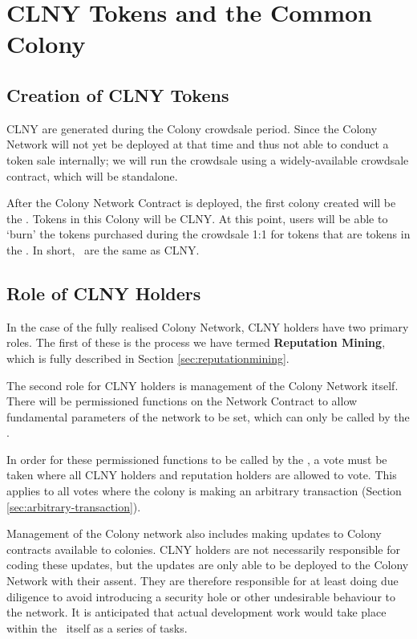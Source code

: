 \section{CLNY Tokens and the Common Colony}\label{sec:clny}

\subsection{Creation of CLNY Tokens}
CLNY are generated during the Colony crowdsale period. Since the Colony Network will not yet be deployed at that time and thus not able to conduct a token sale internally; we will run the crowdsale using a widely-available crowdsale contract, which will be standalone.

After the Colony Network Contract is deployed, the first colony created will be the \rc. Tokens in this Colony will be CLNY. At this point, users will be able to `burn' the tokens purchased during the crowdsale 1:1 for tokens that are tokens in the \rc. In short, \rcts\ are the same as CLNY.

\subsection{Role of CLNY Holders}
In the case of the fully realised Colony Network, CLNY holders have two primary roles. The first of these is the process we have termed \textbf{Reputation Mining}, which is fully described in Section \ref{sec:reputationmining}.

The second role for CLNY holders is management of the Colony Network itself. There will be permissioned functions on the Network Contract to allow fundamental parameters of the network to be set, which can only be called by the \rc.

In order for these permissioned functions to be called by the \rc, a vote must be taken where all CLNY holders and reputation holders are allowed to vote. This applies to all votes where the colony is making an arbitrary transaction (Section \ref{sec:arbitrary-transaction}).

Management of the Colony network also includes making updates to Colony contracts available to colonies. CLNY holders are not necessarily responsible for coding these updates, but the updates are only able to be deployed to the Colony Network with their assent. They are therefore responsible for at least doing due diligence to avoid introducing a security hole or other undesirable behaviour to the network. It is anticipated that actual development work would take place within the \rc\ itself as a series of tasks.


